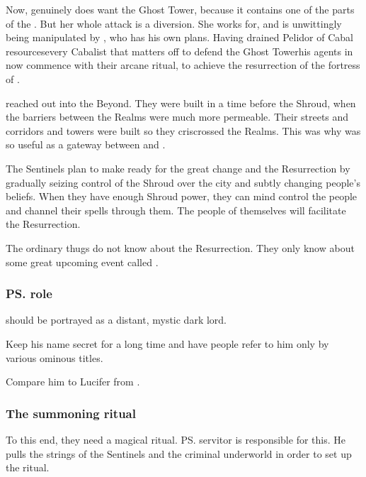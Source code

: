 Now, \Nzessuacrith{} genuinely does want the Ghost Tower, because it contains one of the parts of the . But her whole attack is a diversion. She works for, and is unwittingly being manipulated by \Secherdamon, who has his own plans. Having drained Pelidor of Cabal resources\dash every Cabalist that matters off to defend the Ghost Tower\dash his agents in \Malcur now commence with their arcane ritual, to achieve the resurrection of the fortress of . 

 reached out into the Beyond. 
They were built in a time before the Shroud, when the barriers between the Realms were much more permeable. 
Their streets and corridors and towers were built so they criscrossed the Realms. 
This was why \Nithdornazsh was so useful as a gateway between \Machai and \Azmith. 

The Sentinels plan to make \Malcur ready for the great change and the Resurrection by gradually seizing control of the Shroud over the city and subtly changing people's beliefs. 
When they have enough Shroud power, they can mind control the people and channel their spells through them. 
The people of \Malcur themselves will facilitate the Resurrection. 

The ordinary thugs do not know about the Resurrection. 
They only know about some great upcoming event called . 





\subsubsection{\ps{\Secherdamon} role}
\Secherdamon{} should be portrayed as a distant, mystic dark lord. 

Keep his name secret for a long time and have people refer to him only by various ominous titles. 

Compare him to Lucifer from \FLuneNoire. 






\subsubsection{The summoning ritual}
To this end, they need a magical ritual. \ps{\Secherdamon} servitor  is responsible for this. He pulls the strings of the \Malcuric{} Sentinels and the criminal underworld in order to set up the ritual. 


